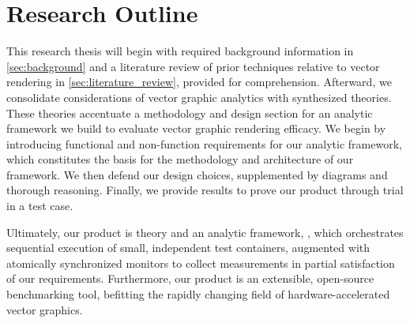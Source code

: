 \section{Research Outline}\label{sec:research_outline}
This research thesis will begin with required background information in \cref{sec:background} and a literature review of prior techniques relative to vector rendering in \cref{sec:literature_review}, provided for comprehension. Afterward, we consolidate considerations of vector graphic analytics with synthesized theories. These theories accentuate a methodology and design section for an analytic framework we build to evaluate vector graphic rendering efficacy. We begin by introducing functional and non-function requirements for our analytic framework, which constitutes the basis for the methodology and architecture of our framework. We then defend our design choices, supplemented by diagrams and thorough reasoning. Finally, we provide results to prove our product through trial in a test case.\medskip

Ultimately, our product is theory and an analytic framework, \toolname, which orchestrates sequential execution of small, independent test containers, augmented with atomically synchronized monitors to collect measurements in partial satisfaction of our requirements. Furthermore, our product is an extensible, open-source benchmarking tool, befitting the rapidly changing field of hardware-accelerated vector graphics.